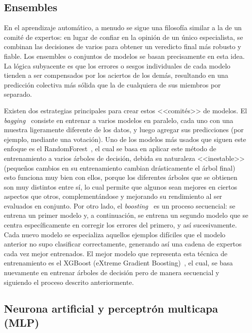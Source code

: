 \subsection{Ensembles}

En el aprendizaje automático, a menudo se sigue una filosofía similar a la de un comité de expertos: en lugar de confiar en la opinión de un único especialista, se combinan las decisiones de varios para obtener un veredicto final más robusto y fiable. Los ensembles o conjuntos de modelos se basan precisamente en esta idea. La lógica subyacente es que los errores o sesgos individuales de cada modelo tienden a ser compensados por los aciertos de los demás, resultando en una predicción colectiva más sólida que la de cualquiera de sus miembros por separado.

Existen dos estrategias principales para crear estos <<comités>> de modelos. El \textit{bagging}~\cite{breiman1996bagging} consiste en entrenar a varios modelos en paralelo, cada uno con una muestra ligeramente diferente de los datos, y luego agregar sus predicciones (por ejemplo, mediante una votación). Uno de los modelos más usados que siguen este enfoque es el RandomForest~\cite{breiman2001random}, el cual se basa en aplicar este método de entrenamiento a varios árboles de decisión, debida su naturaleza <<inestable>> (pequeños cambios en su entrenamiento cambian drásticamente el árbol final) esto funciona muy bien con ellos, porque los diferentes árboles que se obtienen son muy distintos entre sí, lo cual permite que algunos sean mejores en ciertos aspectos que otros, complementándose y mejorando su rendimiento al ser evaluados en conjunto. Por otro lado, el \textit{boosting}~\cite{friedman2002stochastic} es un proceso secuencial: se entrena un primer modelo y, a continuación, se entrena un segundo modelo que se centra específicamente en corregir los errores del primero, y así sucesivamente. Cada nuevo modelo se especializa aquellos ejemplos difíciles que el modelo anterior no supo clasificar correctamente, generando así una cadena de expertos cada vez mejor entrenados. El mejor modelo que representa esta técnica de entrenamiento es el XGBoost (eXtreme Gradient Boosting)~\cite{chen2016xgboost}, el cual, se basa nuevamente en entrenar árboles de decisión pero de manera secuencial y siguiendo el proceso descrito anteriormente.

\subsection{Neurona artificial y perceptrón multicapa (MLP)}


